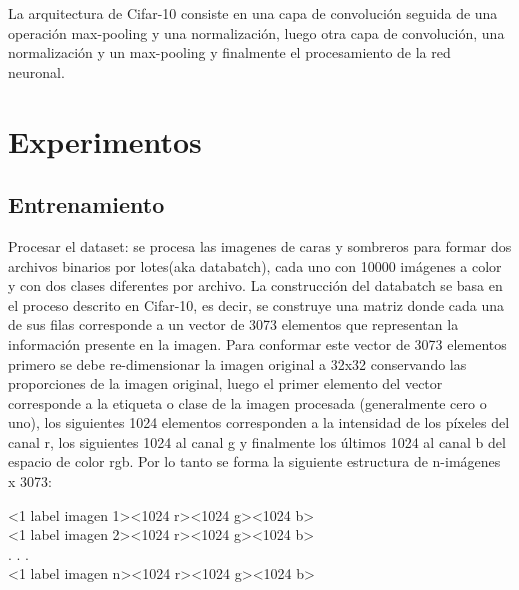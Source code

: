 \documentclass[10pt,twocolumn,letterpaper]{article}
\begin{document}
La arquitectura de Cifar-10 consiste en una capa de convolución seguida de una operación max-pooling y una normalización, luego otra capa de convolución, una normalización y un max-pooling y finalmente el procesamiento de la red neuronal.


\section{Experimentos}
\subsection{Entrenamiento}
Procesar el dataset: se procesa las imagenes de caras y sombreros para formar dos archivos binarios por lotes(aka databatch), cada uno con 10000 imágenes a color y con dos clases diferentes por archivo. La construcción del databatch se basa en el proceso descrito en Cifar-10, es decir, se construye una matriz donde cada una de sus filas corresponde a un vector de 3073 elementos que representan la información presente en la imagen. Para conformar este vector de 3073 elementos primero se debe re-dimensionar la imagen original a 32x32 conservando las proporciones de la imagen original, luego el primer elemento del vector corresponde a la etiqueta o clase de la imagen procesada (generalmente cero o uno), los siguientes 1024 elementos corresponden a la intensidad de los píxeles del canal r, los siguientes 1024 al canal g y finalmente los últimos 1024 al canal b del espacio de color rgb. Por lo tanto se forma la siguiente estructura de n-imágenes x 3073:


\begin{flushleft}
<1 label imagen 1><1024 r><1024 g><1024 b>\\
<1 label imagen 2><1024 r><1024 g><1024 b>\\
. . .\\
<1 label imagen n><1024 r><1024 g><1024 b>\\
\end{flushleft}

\end{document}
